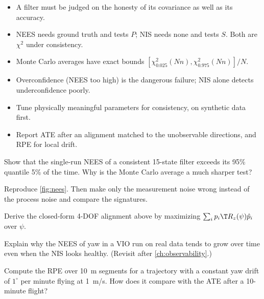 \begin{takeaways}
\begin{itemize}
  \item A filter must be judged on the honesty of its covariance as well as its accuracy.
  \item NEES needs ground truth and tests $P$; NIS needs none and tests $S$. Both are $\chi^2$ under consistency.
  \item Monte Carlo averages have exact bounds $[\chi^2_{0.025}(Nn), \chi^2_{0.975}(Nn)]/N$.
  \item Overconfidence (NEES too high) is the dangerous failure; NIS alone detects underconfidence poorly.
  \item Tune physically meaningful parameters for consistency, on synthetic data first.
  \item Report ATE after an alignment matched to the unobservable directions, and RPE for local drift.
\end{itemize}
\end{takeaways}

\begin{exercises}
  \item Show that the single-run NEES of a consistent 15-state filter exceeds its 95\% quantile 5\% of the time. Why
        is the Monte Carlo average a much sharper test?
  \item Reproduce \cref{fig:nees}. Then make only the measurement noise wrong instead of the process noise and compare
        the signatures.
  \item Derive the closed-form 4-DOF alignment above by maximizing $\sum_i p_i\T R_z(\psi)\hat p_i$ over $\psi$.
  \item Explain why the NEES of yaw in a VIO run on real data tends to grow over time even when the NIS looks
        healthy. (Revisit after \cref{ch:observability}.)
  \item Compute the RPE over 10~m segments for a trajectory with a constant yaw drift of $1^\circ$ per minute flying at
        1~m/s. How does it compare with the ATE after a 10-minute flight?
\end{exercises}
